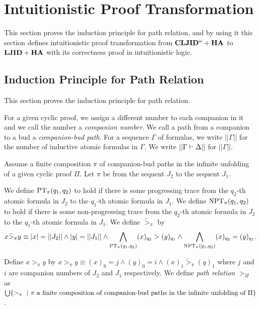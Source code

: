 \section{Intuitionistic Proof Transformation}

This section proves the induction principle for path relation,
and by using it this section defines intuitionistic proof transformation
from ${{\bf CLJID}^\omega+{\bf HA}}$ to ${{\bf LJID}+{\bf HA}}$ with its correctness proof in intuitionistic logic.

\subsection{Induction Principle for Path Relation}

This section proves the induction principle for path relation.

For a given cyclic proof, we assign a different number to each companion
in it and we call the number a {\em companion number}.
We call a path from a companion to a bud a {\em companion-bud path}.
%
For a sequence $\Gamma$ of formulas,
we write $||\Gamma||$ for the number of inductive atomic formulas in $\Gamma$.
We write $||\Gamma \mathrel \vdash \Delta||$ for $||\Gamma||$.

\begin{Def}\rm
Assume a finite composition $\pi$ of companion-bud paths in 
the infinite unfolding of a given cyclic proof $\Pi$.
Let $\pi$ be from the sequent $J_2$ to the sequent $J_1$.

We define
${\rm PT}_\pi(q_1,q_2)$ to hold if
there is some progressing trace from the $q_2$-th atomic formula in $J_2$
to the $q_1$-th atomic formula in $J_1$.
We define
${\rm NPT}_\pi(q_1,q_2)$ to hold if
there is some non-progressing trace from the $q_2$-th atomic formula in $J_2$
to the $q_1$-th atomic formula in $J_1$.
%
We define $\tilde>_{\pi}$ by
{\small
\[
x \tilde>_{\pi} y \equiv
|x|=||J_2|| \land |y|=||J_1|| \land
\displaystyle \mathop \bigwedge_{{\rm PT}_\pi(q_1,q_2)} (x)_{q_2} > (y)_{q_1}
\land
\displaystyle \mathop \bigwedge_{{\rm NPT}_\pi(q_1,q_2)} (x)_{q_2} = (y)_{q_1}.
\]
}

Define $x >_{\pi} y$ by
$
x >_{\pi} y \equiv
(x)_0=j \land (y)_0=i \land  (x)_1 \tilde>_{\pi} (y)_1
$
where $j$ and $i$ are companion numbers of $J_2$ and $J_1$ respectively.
%
We define {\em path relation}
$>_\Pi$ as 
\Break 
{\small $\bigcup \{ >_\pi \ |\ 
\hbox{$\pi$ a finite composition of
companion-bud paths in the infinite unfolding of $\Pi$} \}$.}
\end{Def}

